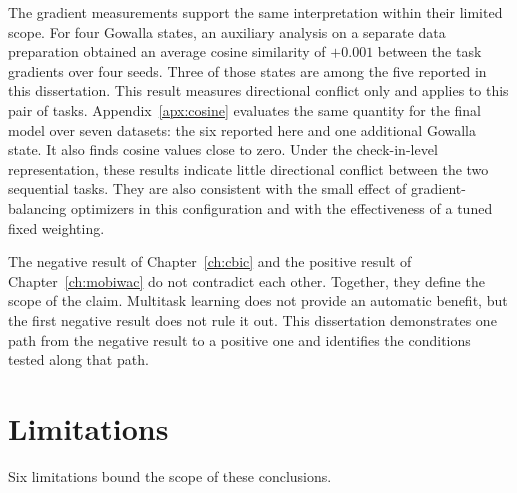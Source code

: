 The gradient measurements support the same interpretation within their limited scope.
For four Gowalla states, an auxiliary analysis on a separate data preparation obtained
an average cosine similarity of $+0.001$ between the task gradients over four seeds.
Three of those states are among the five reported in this dissertation. This result
measures directional conflict only and applies to this pair of tasks.
Appendix~\ref{apx:cosine} evaluates the same quantity for the final model over seven
datasets: the six reported here and one additional Gowalla state. It also finds cosine
values close to zero. Under the check-in-level representation, these results indicate
little directional conflict between the two sequential tasks. They are also consistent
with the small effect of gradient-balancing optimizers in this configuration and with
the effectiveness of a tuned fixed weighting.

The negative result of Chapter~\ref{ch:cbic} and the positive result of
Chapter~\ref{ch:mobiwac} do not contradict each other. Together, they define the scope
of the claim. Multitask learning does not provide an automatic benefit, but the first
negative result does not rule it out. This dissertation demonstrates one path from the
negative result to a positive one and identifies the conditions tested along that path.


\section{Limitations}
\label{sec:conc:limitations}

Six limitations bound the scope of these conclusions.


